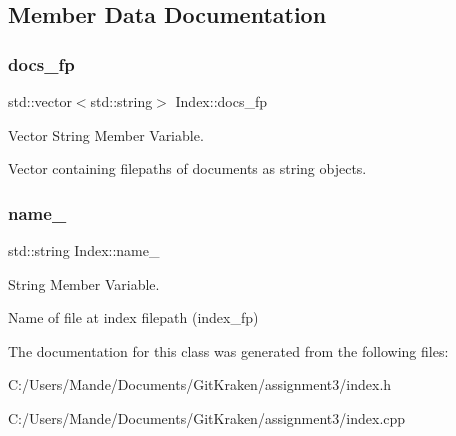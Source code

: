\subsection{Member Data Documentation}
\mbox{\label{class_index_ab62d558f26d98409751e445a806a77b8}} 
\subsubsection{\texorpdfstring{docs\+\_\+fp}{docs\_fp}}
{\footnotesize\ttfamily std\+::vector$<$std\+::string$>$ Index\+::docs\+\_\+fp\hspace{0.3cm}{\ttfamily [private]}}



Vector String Member Variable. 

Vector containing filepaths of documents as string objects. \mbox{\label{class_index_a66c168cae41b8ad8a683163c34772b81}} 
\subsubsection{\texorpdfstring{name\+\_\+}{name\_}}
{\footnotesize\ttfamily std\+::string Index\+::name\+\_\+\hspace{0.3cm}{\ttfamily [private]}}



String Member Variable. 

Name of file at index filepath (index\+\_\+fp) 

The documentation for this class was generated from the following files\+:\begin{DoxyCompactItemize}
\item 
C\+:/\+Users/\+Mande/\+Documents/\+Git\+Kraken/assignment3/index.\+h\item 
C\+:/\+Users/\+Mande/\+Documents/\+Git\+Kraken/assignment3/index.\+cpp\end{DoxyCompactItemize}
